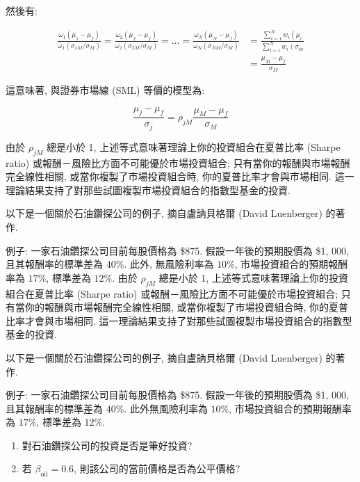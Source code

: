 \documentclass[letterpaper]{article}
\begin{document}
		然後有: 
		
		$$
		\begin{aligned}
			\frac{\omega_{1}\left (\mu_{1}-\mu_{f}\right) }{\omega_{1}\left (\sigma_{1 M} / \sigma_{M}\right) }=\frac{\omega_{2}\left (\mu_{2}-\mu_{f}\right) }{\omega_{2}\left (\sigma_{2 M} / \sigma_{M}\right) }=\ldots=\frac{\omega_{N}\left (\mu_{N}-\mu_{f}\right) }{\omega_{N}\left (\sigma_{N M} / \sigma_{M}\right) } & =\frac{\sum_{i=1}^{N} w_{i}\left (\mu_{i}\right.}{\sum_{i=1}^{N} w_{i}\left (\sigma_{i n}\right.} \\
			& =\frac{\mu_{M}-\mu_{f}}{\sigma_{M}}
		\end{aligned}
		$$
		
		這意味著, 與證券市場線 (SML) 等價的模型為: 
		
		$$
		\frac{\mu_{j}-\mu_{f}}{\sigma_{j}}=\rho_{j M} \frac{\mu_{M}-\mu_{f}}{\sigma_{M}}
		$$
		
		由於 $\rho_{j M}$ 總是小於 1, 上述等式意味著理論上你的投資組合在夏普比率 (Sharpe ratio) 或報酬－風險比方面不可能優於市場投資組合; 只有當你的報酬與市場報酬完全線性相關, 或當你複製了市場投資組合時, 你的夏普比率才會與市場相同.   
		這一理論結果支持了對那些試圖複製市場投資組合的指數型基金的投資. 
		
		以下是一個關於石油鑽探公司的例子, 摘自盧訥貝格爾 (David Luenberger) 的著作.   
		
		例子: 一家石油鑽探公司目前每股價格為 \$875. 假設一年後的預期股價為 \$1, 000, 且其報酬率的標準差為 $40\%$. 此外, 無風險利率為 $10\%$, 市場投資組合的預期報酬率為 $17\%$, 標準差為 $12\%$. 
		由於 $\rho_{j M}$ 總是小於 1, 上述等式意味著理論上你的投資組合在夏普比率 (Sharpe ratio) 或報酬－風險比方面不可能優於市場投資組合; 只有當你的報酬與市場報酬完全線性相關, 或當你複製了市場投資組合時, 你的夏普比率才會與市場相同.   
		這一理論結果支持了對那些試圖複製市場投資組合的指數型基金的投資. 
		
		以下是一個關於石油鑽探公司的例子, 摘自盧訥貝格爾  (David Luenberger) 的著作.   
		
		例子:  一家石油鑽探公司目前每股價格為 \$875. 假設一年後的預期股價為 \$1, 000, 且其報酬率的標準差為 $40\%$. 此外無風險利率為 $10\%$, 市場投資組合的預期報酬率為 $17\%$, 標準差為 $12\%$. 
		
		
		\begin{enumerate}
			\item 對石油鑽探公司的投資是否是筆好投資? 
			\item 若 $\beta_{\text{oil}}=0.6$, 則該公司的當前價格是否為公平價格? 
		\end{enumerate}
		
\end{document}
